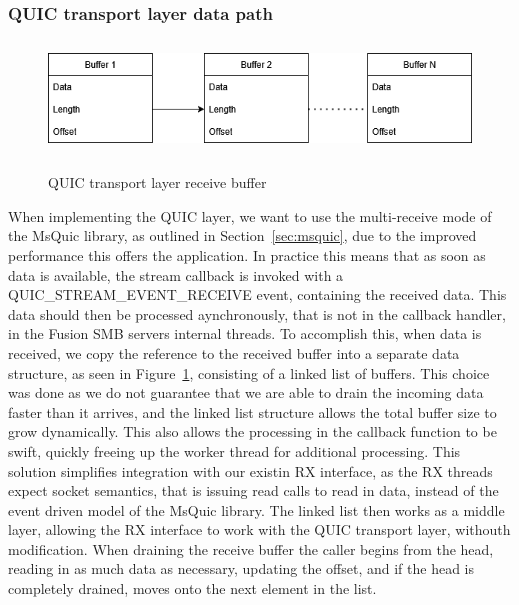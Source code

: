 \documentclass[english, 12pt, a4paper, elec, utf8, a-2b, online]{aaltothesis}
\begin{document}
\subsubsection{QUIC transport layer data path}
\begin{figure}[h]
	\centering
	\includegraphics[alt={Block diagram of the receive buffer of the QUIC layer}, height=3cm]{./images/quic_buffer.png}
	\caption{QUIC transport layer receive buffer}
	\label{fig:msquic_buf}
\end{figure}

When implementing the QUIC layer, we want to use the multi-receive mode of the MsQuic
library, as outlined in Section~\ref{sec:msquic}, due to the improved performance
this offers the application. In practice this means that as soon as data is available,
the stream callback is invoked with a QUIC\_STREAM\_EVENT\_RECEIVE event, containing
the received data. This data should then be processed aynchronously, that is not in
the callback handler, in the Fusion SMB servers internal threads. To accomplish this,
when data is received, we copy the reference to the received buffer into a separate
data structure, as seen in Figure~\ref{fig:msquic_buf}, consisting of a linked list
of buffers. This choice was done as we do not guarantee that we are able to drain 
the incoming data faster than it arrives, and the linked list structure allows
the total buffer size to grow dynamically. This also allows the processing in the
callback function to be swift, quickly freeing up the worker thread for additional processing.
This solution simplifies integration with our existin RX interface, as the RX threads
expect socket semantics, that is issuing read calls to read in data, instead of the
event driven model of the MsQuic library. The linked list then works as a middle
layer, allowing the RX interface to work with the QUIC transport layer, withouth modification.
When draining the receive buffer the caller begins from the head, reading in as
much data as necessary, updating the offset, and if the head is completely drained,
moves onto the next element in the list.
\end{document}
